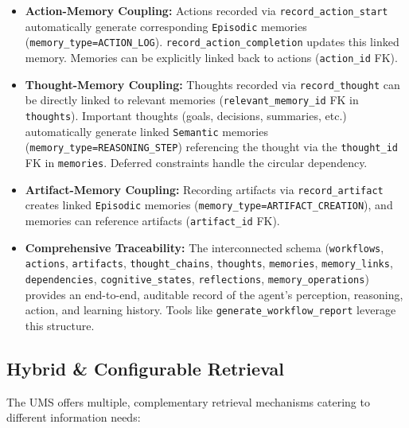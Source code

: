 \documentclass[12pt,a4paper]{article}
\newcommand{\code}[1]{\nolinkurl{#1}}
\begin{document}
\begin{itemize}
    \item \textbf{Action-Memory Coupling:} Actions recorded via \code{record\_action\_start} automatically generate corresponding \code{Episodic} memories (\code{memory\_type=ACTION\_LOG}). \code{record\_action\_completion} updates this linked memory. Memories can be explicitly linked back to actions (\code{action\_id} FK).

    \item \textbf{Thought-Memory Coupling:} Thoughts recorded via \code{record\_thought} can be directly linked to relevant memories (\code{relevant\_memory\_id} FK in \code{thoughts}). Important thoughts (goals, decisions, summaries, etc.) automatically generate linked \code{Semantic} memories (\code{memory\_type=REASONING\_STEP}) referencing the thought via the \code{thought\_id} FK in \code{memories}. Deferred constraints handle the circular dependency.

    \item \textbf{Artifact-Memory Coupling:} Recording artifacts via \code{record\_artifact} creates linked \code{Episodic} memories (\code{memory\_type=ARTIFACT\_CREATION}), and memories can reference artifacts (\code{artifact\_id} FK).

    \item \textbf{Comprehensive Traceability:} The interconnected schema (\code{workflows}, \code{actions}, \code{artifacts}, \code{thought\_chains}, \code{thoughts}, \code{memories}, \code{memory\_links}, \code{dependencies}, \code{cognitive\_states}, \code{reflections}, \code{memory\_operations}) provides an end-to-end, auditable record of the agent's perception, reasoning, action, and learning history. Tools like \code{generate\_workflow\_report} leverage this structure.
\end{itemize}

\subsection{Hybrid \& Configurable Retrieval}

The UMS offers multiple, complementary retrieval mechanisms catering to different information needs:
\end{document}
